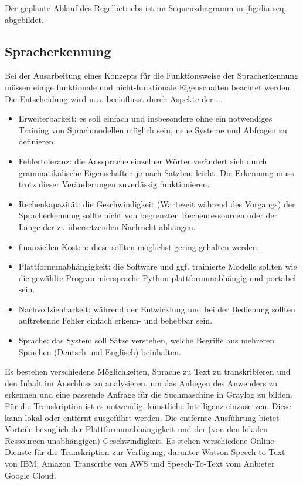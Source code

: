 Der geplante Ablauf des Regelbetriebs ist im Sequenzdiagramm in \autoref{fig:dia-seq} abgebildet.

\subsection{Spracherkennung}
\label{sec:spracherkennung}

Bei der Ausarbeitung eines Konzepts für die Funktionsweise der Spracherkennung müssen einige funktionale und nicht-funktionale Eigenschaften beachtet werden. Die Entscheidung wird u.\,a. beeinflusst durch Aspekte der ... 

\begin{itemize}
\item Erweiterbarkeit: es soll einfach und insbesondere ohne ein notwendiges Training von Sprachmodellen möglich sein, neue Systeme und Abfragen zu definieren.
\item Fehlertoleranz: die Aussprache einzelner Wörter verändert sich durch grammatikalische Eigenschaften je nach Satzbau leicht. Die Erkennung muss trotz dieser Veränderungen zuverlässig funktionieren.
\item Rechenkapazität: die Geschwindigkeit (Wartezeit während des Vorgangs) der Spracherkennung sollte nicht von begrenzten Rechenressourcen oder der Länge der zu übersetzenden Nachricht abhängen.
\item finanziellen Kosten: diese sollten möglichst gering gehalten werden.
\item Plattformunabhängigkeit: die Software und ggf. trainierte Modelle sollten wie die gewählte Programmiersprache Python plattformunabhängig und portabel sein.
\item Nachvollziehbarkeit: während der Entwicklung und bei der Bedienung sollten auftretende Fehler einfach erkenn- und behebbar sein.
\item Sprache: das System soll Sätze verstehen, welche Begriffe aus mehreren Sprachen (Deutsch und Englisch) beinhalten.
\end{itemize}

Es bestehen verschiedene Möglichkeiten, Sprache zu Text zu transkribieren und den Inhalt im Anschluss zu analysieren, um das Anliegen des Anwenders zu erkennen und eine passende Anfrage für die Suchmaschine in Graylog zu bilden. Für die Transkription ist es notwendig, künstliche Intelligenz einzusetzen. Diese kann lokal oder entfernt ausgeführt werden. Die entfernte Ausführung bietet Vorteile bezüglich der Plattformunabhängigkeit und der (von den lokalen Ressourcen unabhängigen) Geschwindigkeit. Es stehen verschiedene Online-Dienste für die Transkription zur Verfügung, darunter Watson Speech to Text von IBM, Amazon Transcribe von AWS und Speech-To-Text vom Anbieter Google Cloud. 

